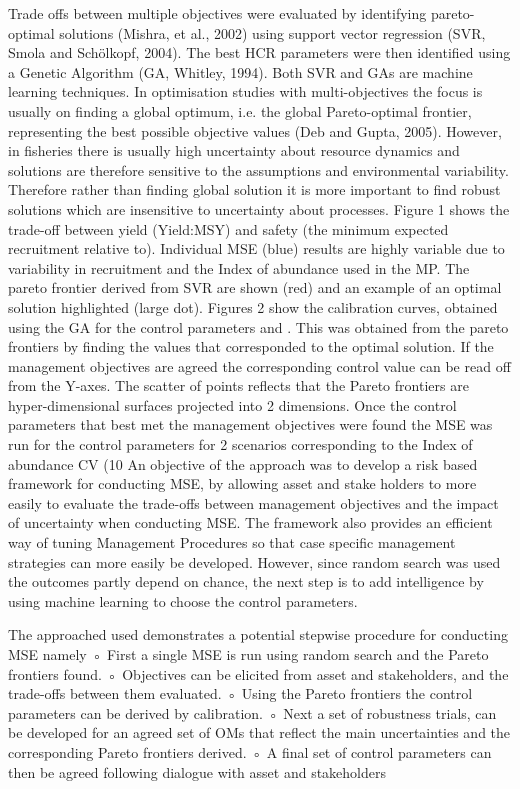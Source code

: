 \documentclass[12pt,doublespacing,a4paper]{ouparticle}
\begin{document}
Trade offs between multiple objectives were evaluated by identifying pareto-optimal solutions (Mishra, et al., 2002) using support vector regression (SVR, Smola and Schölkopf, 2004). The best HCR parameters were then identified using a Genetic Algorithm (GA, Whitley, 1994). Both SVR and GAs are machine learning techniques. 
In optimisation studies with multi-objectives the focus is usually on finding a global optimum, i.e. the global Pareto-optimal frontier, representing the best possible objective values (Deb and Gupta, 2005).  However, in fisheries  there is usually high uncertainty about resource dynamics and solutions are therefore sensitive to the assumptions and environmental variability.  Therefore rather than finding global solution it is more important to find  robust solutions which are insensitive to uncertainty about processes. 
Figure 1 shows the trade-off between yield (Yield:MSY) and safety (the minimum expected recruitment relative to). Individual MSE (blue) results are highly variable due to variability in recruitment and the Index of abundance used in the MP. The pareto frontier   derived from SVR are shown (red) and an example of an optimal solution highlighted (large dot).
Figures 2 show the calibration curves, obtained using the GA for the control parameters  and . This was obtained from the pareto frontiers by finding the values that corresponded to the optimal solution. If the management objectives are agreed the corresponding control value can be read off from the Y-axes. The scatter of points reflects that the Pareto frontiers are hyper-dimensional surfaces projected into 2 dimensions.
Once the control parameters that best met the management objectives were found the MSE was run for the control parameters for 2 scenarios corresponding to the Index of abundance CV (10%
An objective of the approach was to develop a risk based framework for conducting MSE, by allowing asset and stake holders to more easily to evaluate the trade-offs between management objectives and the impact of uncertainty when conducting MSE. The framework also provides an efficient way of tuning Management Procedures so that case specific management strategies can more easily be developed. However, since random search was used the outcomes partly depend on chance, the next step is to add intelligence by using machine learning to choose the control parameters.

The approached used demonstrates a potential stepwise procedure for conducting MSE namely
        ◦ First a single MSE is run using random search and the Pareto frontiers found.
        ◦ Objectives can be elicited from asset and stakeholders, and the trade-offs between them evaluated.
        ◦ Using the Pareto frontiers the control parameters can be derived by calibration.
        ◦ Next a set of robustness trials, can be developed for an agreed set of OMs that reflect the main uncertainties and the corresponding Pareto frontiers derived.
        ◦ A final set of control parameters can then be agreed following dialogue with asset and stakeholders
\end{document}
